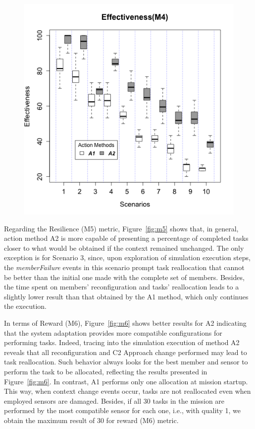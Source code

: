 \begin{figure}
\begin{minipage}{.5\textwidth}
  \includegraphics[width=0.95\linewidth]{img/graphs/Boxplot_M4.png}
  \label{fig:m4}
\end{minipage}
\end{figure}


Regarding the Resilience (M5) metric, Figure~\ref{fig:m5} shows that, in general, action method A2 is more capable of presenting a percentage of completed tasks closer to what would be obtained if the context remained unchanged. The only exception is for Scenario 3, since, upon exploration of simulation execution steps, the \emph{memberFailure} events in this scenario prompt task reallocation that cannot be better than the initial one made with the complete set of members. Besides, the time spent on members’ reconfiguration and tasks’ reallocation leads to a slightly lower result than that obtained by the A1 method, which only continues the execution.  

In terms of Reward (M6), Figure~\ref{fig:m6} shows better results for A2 indicating that the system adaptation provides more compatible configurations for performing tasks. Indeed, tracing into the simulation execution of method A2 reveals that all reconfiguration and C2 Approach change performed may lead to task reallocation. Such behavior always looks for the best member and sensor to perform the task to be allocated, reflecting the results presented in Figure~\ref{fig:m6}. In contrast, A1 performs only one allocation at mission startup. This way, when context change events occur, tasks are not \color{black}reallocated even when employed \color{black}sensors are damaged. Besides, if all 30 tasks in the mission are performed by the most compatible sensor for each one, i.e., with quality 1, we obtain the maximum result of 30 for reward (M6) metric. 



